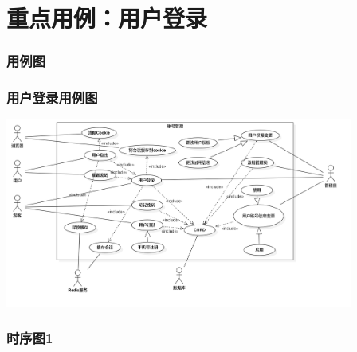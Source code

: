 \section{重点用例：用户登录}
\begin{frame}
    \frametitle{用例图}
    \frametitle{用户登录用例图}
    \center
    \includegraphics[width=4.5in]{contents/figure/login_usecase_diagram.png}
\end{frame}
\begin{frame}
    \frametitle{时序图1}
    \center
    
\end{frame}
